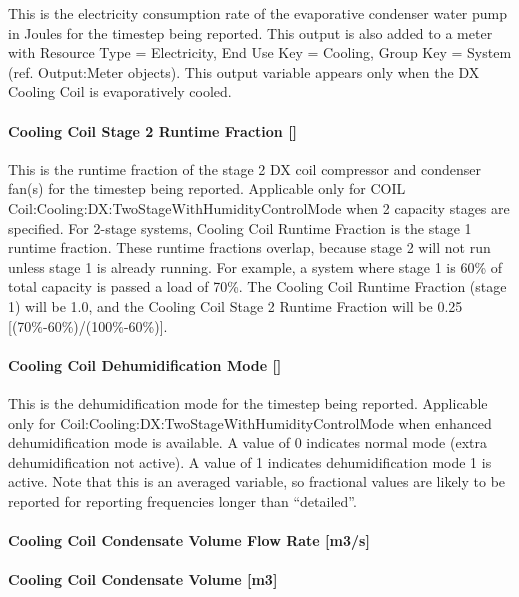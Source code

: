This is the electricity consumption rate of the evaporative condenser water pump in Joules for the timestep being reported. This output is also added to a meter with Resource Type = Electricity, End Use Key = Cooling, Group Key = System (ref. Output:Meter objects). This output variable appears only when the DX Cooling Coil is evaporatively cooled.

\paragraph{Cooling Coil Stage 2 Runtime Fraction {[]}}\label{cooling-coil-stage-2-runtime-fraction}

This is the runtime fraction of the stage 2 DX coil compressor and condenser fan(s) for the timestep being reported. Applicable only for COIL Coil:Cooling:DX:TwoStageWithHumidityControlMode when 2 capacity stages are specified. For 2-stage systems, Cooling Coil Runtime Fraction is the stage 1 runtime fraction. These runtime fractions overlap, because stage 2 will not run unless stage 1 is already running. For example, a system where stage 1 is 60\% of total capacity is passed a load of 70\%. The Cooling Coil Runtime Fraction (stage 1) will be 1.0, and the Cooling Coil Stage 2 Runtime Fraction will be 0.25 {[}(70\%-60\%)/(100\%-60\%){]}.

\paragraph{Cooling Coil Dehumidification Mode {[]}}\label{cooling-coil-dehumidification-mode}

This is the dehumidification mode for the timestep being reported. Applicable only for Coil:Cooling:DX:TwoStageWithHumidityControlMode when enhanced dehumidification mode is available. A value of 0 indicates normal mode (extra dehumidification not active). A value of 1 indicates dehumidification mode 1 is active. Note that this is an averaged variable, so fractional values are likely to be reported for reporting frequencies longer than ``detailed''.

\paragraph{Cooling Coil Condensate Volume Flow Rate {[}m3/s{]}}\label{cooling-coil-condensate-volume-flow-rate-m3s-4}

\paragraph{Cooling Coil Condensate Volume {[}m3{]}}\label{cooling-coil-condensate-volume-m3-4}

